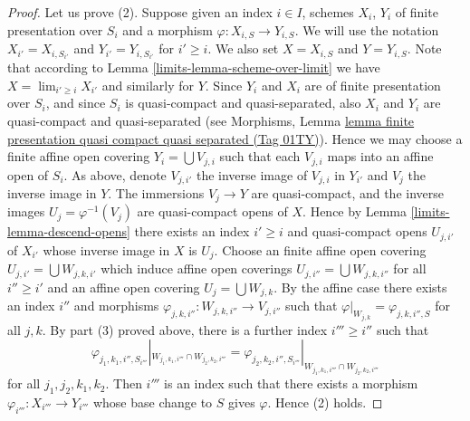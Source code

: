 \documentclass{amsart}
\theoremstyle{plain}
\theoremstyle{definition}
\theoremstyle{remark}
\numberwithin{equation}{subsection}
\def\lim{\mathop{\mathrm{lim}}\nolimits}
\begin{document}
\begin{proof}
\medskip\noindent
Let us prove (2). Suppose given an index $i \in I$, schemes
$X_i$, $Y_i$ of finite presentation over $S_i$ and a morphism
$\varphi : X_{i, S} \to Y_{i, S}$. We will use the notation
$X_{i'} = X_{i, S_{i'}}$ and $Y_{i'} = Y_{i, S_{i'}}$ for
$i' \geq i$. We also set $X = X_{i, S}$ and $Y = Y_{i, S}$.
Note that according to Lemma \ref{limits-lemma-scheme-over-limit} we have
$X = \lim_{i' \geq i} X_{i'}$ and similarly for $Y$.
Since $Y_i$ and $X_i$ are of finite presentation
over $S_i$, and since $S_i$ is quasi-compact and quasi-separated, also
$X_i$ and $Y_i$ are quasi-compact and quasi-separated
(see Morphisms,
Lemma \href{https://stacks.math.columbia.edu/tag/01TY}{lemma finite presentation quasi compact quasi separated (Tag 01TY)}).
Hence we may choose a finite affine open covering
$Y_i = \bigcup V_{j, i}$ such that each $V_{j, i}$ maps into
an affine open of $S_i$. As above, denote $V_{j, i'}$ the inverse
image of $V_{j, i}$ in $Y_{i'}$ and $V_j$ the inverse image in $Y$.
The immersions $V_j \to Y$ are quasi-compact, and the inverse images
$U_j = \varphi^{-1}(V_j)$ are quasi-compact opens of $X$.
Hence by Lemma \ref{limits-lemma-descend-opens} there exists an index
$i' \geq i$ and quasi-compact opens $U_{j, i'}$ of $X_{i'}$
whose inverse image in $X$ is $U_j$. Choose an finite affine open covering
$U_{j, i'} = \bigcup W_{j, k, i'}$ which induce affine open
coverings $U_{j, i''} = \bigcup W_{j, k, i''}$
for all $i'' \geq i'$ and an affine open covering
$U_j = \bigcup W_{j, k}$. By the affine case there exists
an index $i''$ and morphisms
$\varphi_{j, k, i''} : W_{j, k, i''} \to V_{j, i''}$
such that
$\varphi|_{W_{j, k}} = \varphi_{j, k, i'', S}$ for all $j, k$.
By part (3) proved above, there is a further index $i''' \geq i''$
such that
$$
\varphi_{j_1, k_1, i'', S_{i'''}}|_{W_{j_1, k_1, i'''} \cap W_{j_2, k_2, i'''}}
=
\varphi_{j_2, k_2, i'', S_{i'''}}|_{W_{j_1, k_1, i'''} \cap W_{j_2, k_2, i'''}}
$$
for all $j_1, j_2, k_1, k_2$. Then $i'''$ is an index such that
there exists a morphism $\varphi_{i'''} : X_{i'''} \to Y_{i'''}$
whose base change to $S$ gives $\varphi$. Hence (2) holds.


\end{proof}
\end{document}
